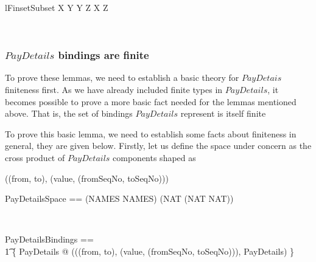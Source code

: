 \begin{LToolkit}
\begin{theorem}{lFinsetSubset}
  X \in \power Y \land Y \in \finset Z \implies X \in \finset Z
\end{theorem}~\end{LToolkit}

\subsubsection{$PayDetails$ bindings are finite}

To prove these lemmas, we need to establish a basic theory for $PayDetais$ finiteness first.
As we have already included finite types in $PayDetails$, it becomes possible to prove a more basic
fact needed for the lemmas mentioned above. That is, the set of bindings $PayDetails$ represent is itself finite
%
%
To prove this basic lemma, we need to establish some facts about finiteness in general, they are given below.
Firstly, let us define the space under concern as the cross product of $PayDetails$ components
shaped as
\begin{gzed}
((from, to), (value, (fromSeqNo, toSeqNo)))
\end{gzed}
%
\begin{LNewADef}
\begin{zed}
   PayDetailsSpace == (NAMES \cross NAMES) \cross (NAT \cross (NAT \cross NAT))
\end{zed}~\end{LNewADef}

\begin{LNewADef}
\begin{zed}
   PayDetailsBindings == \\
    \t1 \{ PayDetails @ (((from, to), (value, (fromSeqNo, toSeqNo))), \theta PayDetails) \}
\end{zed}~\end{LNewADef}

\begin{LNewLemma}
~\end{LNewLemma}

